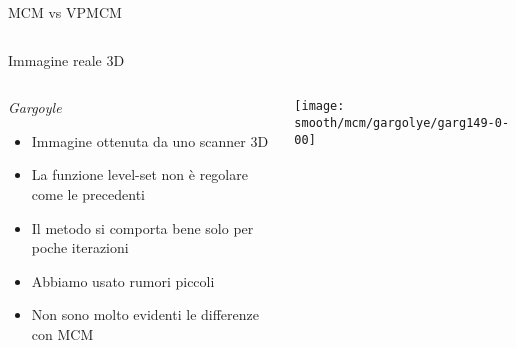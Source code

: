 \begin{frame}{MCM vs VPMCM}
 \begin{columns}[T]
  \begin{column}{5cm}
    \centering
    \end{column}
  \begin{column}[T]{5cm}
    \centering
    \end{column}
 \end{columns}
\begin{columns}[T]
  \begin{column}{5cm}
    \centering
    \end{column}
  \begin{column}[T]{5cm}
    \centering
    \end{column}
  \end{columns}
\end{frame}



\begin{frame}{Immagine reale 3D}
 \begin{columns}[T]
    \begin{column}{4cm}
      \begin{block}{\emph{Gargoyle}}
        \begin{itemize}
        \item Immagine ottenuta da uno scanner 3D
        \item La funzione level-set non è regolare come le precedenti 
        \item Il metodo si comporta bene solo per poche iterazioni
        \item Abbiamo usato rumori piccoli
        \item Non sono molto evidenti le differenze con MCM
        \end{itemize}
      \end{block}
    \end{column}
   \begin{column}{6cm}
     \texttt{[image: smooth/mcm/gargolye/garg149-0-00]}
   \end{column}
  \end{columns}
\end{frame}

